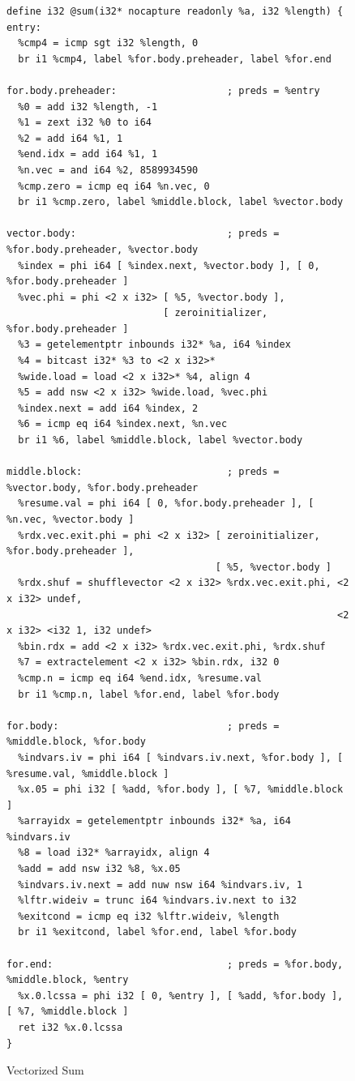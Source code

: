 \documentclass[a4paper,bibliography=totocnumbered,parskip,headsepline]{scrbook}
\begin{document}
\begin{figure}
\begin{lstlisting}[basicstyle=\scriptsize\ttfamily]
define i32 @sum(i32* nocapture readonly %a, i32 %length) {
entry:
  %cmp4 = icmp sgt i32 %length, 0
  br i1 %cmp4, label %for.body.preheader, label %for.end

for.body.preheader:                   ; preds = %entry
  %0 = add i32 %length, -1
  %1 = zext i32 %0 to i64
  %2 = add i64 %1, 1
  %end.idx = add i64 %1, 1
  %n.vec = and i64 %2, 8589934590
  %cmp.zero = icmp eq i64 %n.vec, 0
  br i1 %cmp.zero, label %middle.block, label %vector.body

vector.body:                          ; preds = %for.body.preheader, %vector.body
  %index = phi i64 [ %index.next, %vector.body ], [ 0, %for.body.preheader ]
  %vec.phi = phi <2 x i32> [ %5, %vector.body ],
                           [ zeroinitializer, %for.body.preheader ]
  %3 = getelementptr inbounds i32* %a, i64 %index
  %4 = bitcast i32* %3 to <2 x i32>*
  %wide.load = load <2 x i32>* %4, align 4
  %5 = add nsw <2 x i32> %wide.load, %vec.phi
  %index.next = add i64 %index, 2
  %6 = icmp eq i64 %index.next, %n.vec
  br i1 %6, label %middle.block, label %vector.body

middle.block:                         ; preds = %vector.body, %for.body.preheader
  %resume.val = phi i64 [ 0, %for.body.preheader ], [ %n.vec, %vector.body ]
  %rdx.vec.exit.phi = phi <2 x i32> [ zeroinitializer, %for.body.preheader ],
                                    [ %5, %vector.body ]
  %rdx.shuf = shufflevector <2 x i32> %rdx.vec.exit.phi, <2 x i32> undef,
                                                         <2 x i32> <i32 1, i32 undef>
  %bin.rdx = add <2 x i32> %rdx.vec.exit.phi, %rdx.shuf
  %7 = extractelement <2 x i32> %bin.rdx, i32 0
  %cmp.n = icmp eq i64 %end.idx, %resume.val
  br i1 %cmp.n, label %for.end, label %for.body

for.body:                             ; preds = %middle.block, %for.body
  %indvars.iv = phi i64 [ %indvars.iv.next, %for.body ], [ %resume.val, %middle.block ]
  %x.05 = phi i32 [ %add, %for.body ], [ %7, %middle.block ]
  %arrayidx = getelementptr inbounds i32* %a, i64 %indvars.iv
  %8 = load i32* %arrayidx, align 4
  %add = add nsw i32 %8, %x.05
  %indvars.iv.next = add nuw nsw i64 %indvars.iv, 1
  %lftr.wideiv = trunc i64 %indvars.iv.next to i32
  %exitcond = icmp eq i32 %lftr.wideiv, %length
  br i1 %exitcond, label %for.end, label %for.body

for.end:                              ; preds = %for.body, %middle.block, %entry
  %x.0.lcssa = phi i32 [ 0, %entry ], [ %add, %for.body ], [ %7, %middle.block ]
  ret i32 %x.0.lcssa
}
\end{lstlisting}
\caption{Vectorized Sum}
\label{fig:sumllvec}
\end{figure}
\end{document}
